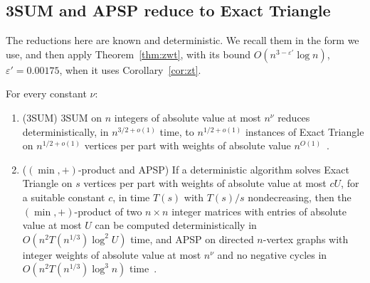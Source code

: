 \subsection{3SUM and APSP reduce to Exact Triangle}\label{sec:3sumapsp}

The reductions here are known and deterministic. We recall them in the form we use, and then apply Theorem~\ref{thm:zwt}, with its bound $O(n^{3-\varepsilon'}\log n)$, $\varepsilon'=0.00175$, when it uses Corollary~\ref{cor:zt}. 

\begin{theorem}\label{thm:knownred}
For every constant $\nu$:
\begin{enumerate}
\item[(a)] \textup{($3$SUM)} $3$SUM on $n$ integers of absolute value at most $n^\nu$ reduces deterministically, in $n^{3/2+o(1)}$ time, to $n^{1/2+o(1)}$ instances of Exact Triangle on $n^{1/2+o(1)}$ vertices per part with weights of absolute value $n^{O(1)}$~\cite{CH20,VW13}.
\item[(b)] \textup{($(\min,+)$-product and APSP)} If a deterministic algorithm solves Exact Triangle on $s$ vertices per part with weights of absolute value at most $cU$, for a suitable constant $c$, in time $T(s)$ with $T(s)/s$ nondecreasing, then the $(\min,+)$-product of two $n\times n$ integer matrices with entries of absolute value at most $U$ can be computed deterministically in $O(n^2T(n^{1/3})\log^2U)$ time, and APSP on directed $n$-vertex graphs with integer weights of absolute value at most $n^\nu$ and no negative cycles in $O(n^2T(n^{1/3})\log^3n)$ time~\cite{VW10,VW18,VW13}.
\end{enumerate}
\end{theorem}



